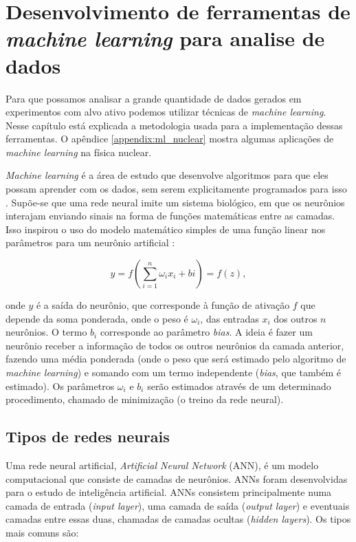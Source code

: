 \documentclass[a4paper,12pt,oneside]{book}
\begin{document}
\chapter{Desenvolvimento de ferramentas de \textit{machine learning} para analise de dados}\label{sec:ml}

\par Para que possamos analisar a grande quantidade de dados gerados em experimentos com alvo ativo podemos utilizar técnicas de \textit{machine learning}. Nesse capítulo está explicada a metodologia usada para a implementação dessas ferramentas. O apêndice \ref{appendix:ml_nuclear} mostra algumas aplicações de \textit{machine learning} na física nuclear.

\par \textit{Machine learning} é a área de estudo que desenvolve algoritmos para que eles possam aprender com os dados, sem serem explicitamente programados para isso \cite{mlbook}. Supõe-se que uma rede neural imite um sistema biológico, em que os neurônios interajam enviando sinais na forma de funções matemáticas entre as camadas. Isso inspirou o uso do modelo matemático simples de uma função linear nos parâmetros para um neurônio artificial \cite{curso}:

\begin{equation}\label{eq:model_n}
    y = f\left(\sum^{n}_{i = 1}\omega_i x_i + bi\right) = f(z),
\end{equation}

\par onde $y$ é a saída do neurônio, que corresponde à função de ativação $f$ que depende da soma ponderada, onde o peso é $\omega_i$, das entradas $x_i$ dos outros $n$ neurônios. O termo $b_i$ corresponde ao parâmetro \textit{bias}. A ideia é fazer um neurônio receber a informação de todos os outros neurônios da camada anterior, fazendo uma média ponderada (onde o peso que será estimado pelo algoritmo de \textit{machine learning}) e somando com um termo independente (\textit{bias}, que também é estimado). Os parâmetros $\omega_i$ e $b_i$ serão estimados através de um determinado procedimento, chamado de minimização (o treino da rede neural).

\section{Tipos de redes neurais}

\par Uma rede neural artificial, \textit{Artificial Neural Network} (ANN), é um modelo computacional que consiste de camadas de neurônios. ANNs foram desenvolvidas para o estudo de inteligência artificial\cite{mlbook, mldiverso}. ANNs consistem principalmente numa camada de entrada (\textit{input layer}), uma camada de saída (\textit{output layer}) e eventuais camadas entre essas duas, chamadas de camadas ocultas (\textit{hidden layers}). Os tipos mais comuns são:
\end{document}
